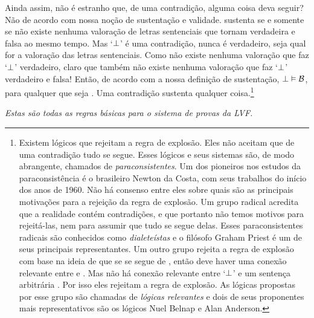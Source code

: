 Ainda assim, não é estranho que, de uma contradição, alguma coisa deva seguir? Não de acordo com nossa noção de sustentação e validade.  sustenta  se e somente se não existe nenhuma valoração de letras sentenciais que tornam  verdadeira e  falsa ao mesmo tempo. Mas `$\bot$' é uma contradição, nunca é verdadeiro, seja qual for a valoração das letras sentenciais.  Como não existe nenhuma valoração que faz  `$\bot$' verdadeiro, claro que também não existe nenhuma valoração que faz  `$\bot$'  verdadeiro e  falsa! Então, de acordo com a nossa definição de sustentação,  $\bot \vDash \mathcal{B}$,  para qualquer que seja . Uma contradição sustenta qualquer coisa.\footnote{
	Existem lógicos que rejeitam a regra de explosão. Eles não aceitam que de uma contradição tudo se segue. Esses lógicos e seus sistemas são, de modo abrangente, chamados de \textit{paraconsistentes}. Um dos pioneiros nos estudos da paraconsistência  é o brasileiro Newton da Costa, com seus trabalhos do início dos anos de 1960. Não há consenso entre eles sobre quais são as principais motivações para a rejeição da regra de explosão. Um grupo radical acredita que a realidade contém contradições, e que portanto não temos motivos para rejeitá-las, nem para assumir que tudo se segue delas. Esses paraconsistentes radicais são conhecidos como \textit{dialeteístas} e o filósofo Graham Priest é um de seus principais representantes. Um outro grupo rejeita a regra de explosão com base na ideia de que se  se segue de , então deve haver uma conexão relevante entre  e . Mas não há conexão relevante entre `$\bot$' e um sentença arbitrária . Por isso eles rejeitam a regra de explosão. As lógicas propostas por esse grupo são chamadas de \textit{lógicas relevantes} e dois de seus proponentes mais representativos são os lógicos Nuel Belnap e Alan Anderson.}

\emph{Estas são todas as regras básicas para o sistema de provas da LVF.}


\practiceproblems

